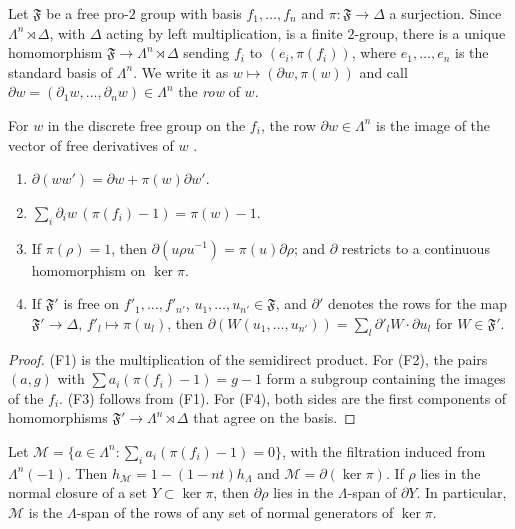 \begin{definition}\label{tw:row}
Let $\mathfrak F$ be a free pro-$2$ group with basis $f_1,\dots,f_n$ and
$\pi\colon\mathfrak F\to\Delta$ a surjection. Since $\Lambda^n\rtimes\Delta$,
with $\Delta$ acting by left multiplication, is a finite $2$-group, there is
a unique homomorphism $\mathfrak F\to\Lambda^n\rtimes\Delta$ sending $f_i$ to
$(e_i,\pi(f_i))$, where $e_1,\dots,e_n$ is the standard basis of $\Lambda^n$.
We write it as $w\mapsto(\partial w,\pi(w))$ and call
$\partial w=(\partial_1w,\dots,\partial_nw)\in\Lambda^n$ the \emph{row} of $w$.
\end{definition}

For $w$ in the discrete free group on the $f_i$, the row
$\partial w\in\Lambda^n$ is the image of the vector of free derivatives of $w$
\cite[Section~2]{Fox1953}.

\begin{lemma}\label{tw:row-properties}
\begin{enumerate}
\item[(F1)] $\partial(ww')=\partial w+\pi(w)\partial w'$.
\item[(F2)] $\sum_i\partial_iw\,(\pi(f_i)-1)=\pi(w)-1$.
\item[(F3)] If $\pi(\rho)=1$, then $\partial(u\rho u^{-1})=\pi(u)\partial\rho$;
 and $\partial$ restricts to a continuous homomorphism on $\ker\pi$.
\item[(F4)] If $\mathfrak F'$ is free on $f'_1,\dots,f'_{n'}$,
 $u_1,\dots,u_{n'}\in\mathfrak F$, and $\partial'$ denotes the rows for the map
 $\mathfrak F'\to\Delta$, $f'_l\mapsto\pi(u_l)$, then
 $\partial(W(u_1,\dots,u_{n'}))=\sum_l\partial'_lW\cdot\partial u_l$ for
 $W\in\mathfrak F'$.
\end{enumerate}
\end{lemma}

\begin{proof}
(F1) is the multiplication of the semidirect product. For (F2), the pairs
$(a,g)$ with $\sum a_i(\pi(f_i)-1)=g-1$ form a subgroup containing the
images of the $f_i$. (F3) follows from (F1). For (F4), both sides are the first
components of homomorphisms $\mathfrak F'\to\Lambda^n\rtimes\Delta$ that agree
on the basis.
\end{proof}

\begin{lemma}\label{tw:fox-rows}
Let $\mathcal M=\{a\in\Lambda^n:\sum_ia_i(\pi(f_i)-1)=0\}$, with the
filtration induced from $\Lambda^n(-1)$. Then
$h_{\mathcal M}=1-(1-nt)h_\Lambda$ and $\mathcal M=\partial(\ker\pi)$. If
$\rho$ lies in the normal closure of a set $Y\subset\ker\pi$, then
$\partial\rho$ lies in the $\Lambda$-span of $\partial Y$. In particular,
$\mathcal M$ is the $\Lambda$-span of the rows of any set of normal
generators of $\ker\pi$.
\end{lemma}

